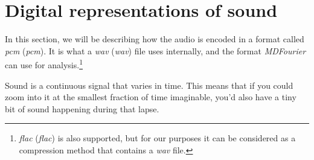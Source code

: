\documentclass[10pt,a4paper]{report}
\newcommand{\define}[1]{\textit{\acrlong{#1}} (\textit{\acrshort{#1}})}
\newcommand{\ac}[1]{\textit{\mbox{\acrshort{#1}}}}
\begin{document}
\begin{center}
\end{center}

\section{Digital representations of sound}

In this section, we will be describing how the audio is encoded in a format called \define{pcm}. It is what a \define{wav} file uses internally, and the format \textit{MDFourier} can use for analysis.\footnote{\define{flac} is also supported, but for our purposes it can be considered as a compression method that contains a \ac{wav} file.}

Sound is a continuous signal that varies in time. This means that if you could zoom into it at the smallest fraction of time imaginable, you'd also have a tiny bit of sound happening during that lapse. 
\end{document}
